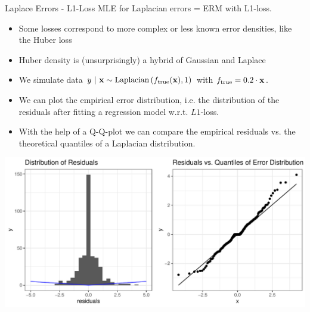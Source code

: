 \documentclass[11pt,compress,t,notes=noshow, xcolor=table]{beamer}
\begin{document}
\begin{vbframe}{Laplace Errors - L1-Loss}
MLE for Laplacian errors = ERM with L1-loss. 

\begin{itemize}
\item Some losses correspond to more complex or less known error densities, like the Huber loss 

\item Huber density is (unsurprisingly) a hybrid of Gaussian and Laplace

\end{itemize}

\framebreak 

\begin{footnotesize}
\begin{itemize}
	\item We simulate data $y ~|~\mathbf{x} \sim \text{Laplacian}\left(f_{\text{true}}(\mathbf{x}), 1\right)$ with $f_{\text{true}} = 0.2 \cdot \mathbf{x}$. 
\item We can plot the empirical error distribution, i.e. the distribution of the residuals after fitting a regression model w.r.t. $L1$-loss.
\item With the help of a Q-Q-plot we can compare the empirical residuals vs. the theoretical quantiles of a Laplacian distribution.  
\end{itemize}
\end{footnotesize}
\includegraphics{figure/residuals_plot_L1.pdf}



\end{vbframe}
\end{document}

